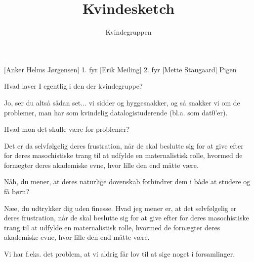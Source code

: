 \documentclass[a4paper,11pt]{article}
\title{Kvindesketch}
\author{Kvindegruppen}
\begin{document}
\maketitle

\begin{roles}
[Anker Helms Jørgensen] 1. fyr
[Erik Meiling] 2. fyr
[Mette Staugaard] Pigen
\end{roles}

\begin{sketch}

 Hvad laver I egentlig i den der kvindegruppe?

 Jo, ser du altså sådan set... vi sidder og hyggesnakker, og
så snakker vi om de problemer, man har som kvindelig
datalogistuderende (bl.a. som dat0'er).

 Hvad mon det skulle være for problemer?

 Det er da selvfølgelig deres frustration, når de skal
beslutte sig for at give efter for deres masochistiske trang til at
udfylde en maternalistisk rolle, hvormed de fornægter deres akademiske
evne, hvor lille den end måtte være.

 Nåh, du mener, at deres naturlige dovenskab forhindrer dem i
både at studere og få børn?

 Næe, du udtrykker dig uden finesse.  Hvad jeg mener er, at
det selvfølgelig er deres frustration, når de skal beslutte sig for at
give efter for deres masochistiske trang til at udfylde en
maternalistisk rolle, hvormed de fornægter deres akademiske evne, hvor
lille den end måtte være.

 Vi har f.eks. det problem, at vi aldrig får lov til at sige
noget i forsamlinger.
\end{sketch}
\end{document}
